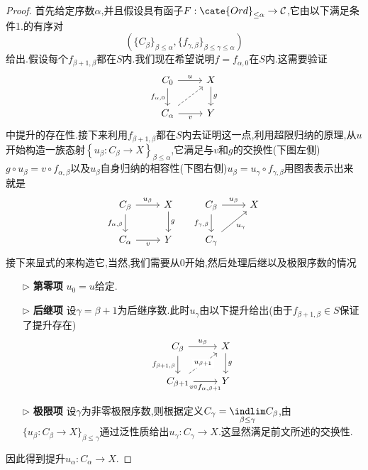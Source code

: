 \begin{proof}
    首先给定序数$\alpha$,并且假设具有函子$F : \cate{Ord}_{\leq \alpha}\to \mathcal{C}$,它由以下满足条件1.的有序对
    \[
        \left( \{C_{\beta}\}_{\beta \leq \alpha}, \{f_{\gamma,\beta}\}_{\beta \leq \gamma \leq \alpha} \right)
    \]
    给出.假设每个$f_{\beta+1,\beta}$都在$S$内.我们现在希望说明$f = f_{\alpha,0}$在$S$内.这需要验证
    \[\begin{tikzcd}
	{C_0} & X \\
	{C_{\alpha}} & Y
	\arrow["u", from=1-1, to=1-2]
	\arrow["{f_{\alpha,0}}"', from=1-1, to=2-1]
	\arrow["g", from=1-2, to=2-2]
	\arrow[dashed, from=2-1, to=1-2]
	\arrow["v"', from=2-1, to=2-2]
    \end{tikzcd}\]
    中提升的存在性.接下来利用$f_{\beta+1,\beta}$都在$S$内去证明这一点,利用超限归纳的原理,从$u$开始构造一族态射$\left\{ u_{\beta}: C_{\beta} \to X \right\}_{\beta \leq \alpha}$,它满足与$v$和$g$的交换性(下图左侧)$g\circ u_{\beta} = v\circ f_{\alpha,\beta}$以及$u_{\beta}$自身归纳的相容性(下图右侧)$u_{\beta}=u_{\gamma}\circ f_{\gamma,\beta}$用图表表示出来就是
    \[\begin{tikzcd}
	{C_{\beta}} & X & {C_{\beta}} & X \\
	{C_{\alpha}} & Y & {C_{\gamma}}
	\arrow["{u_{\beta}}", from=1-1, to=1-2]
	\arrow["{f_{\alpha,\beta}}"', from=1-1, to=2-1]
	\arrow["g", from=1-2, to=2-2]
	\arrow["{u_{\beta}}", from=1-3, to=1-4]
	\arrow["{f_{\gamma,\beta}}"', from=1-3, to=2-3]
	\arrow["v"', from=2-1, to=2-2]
	\arrow["{u_{\gamma}}"', from=2-3, to=1-4]
    \end{tikzcd}\]
    接下来显式的来构造它,当然,我们需要从$0$开始,然后处理后继以及极限序数的情况
    \begin{enumerate}
        \item[$\triangleright$ \textbf{第零项}] $u_0 = u$给定.
        \item[$\triangleright$ \textbf{后继项}] 设$\gamma = \beta +1$为后继序数.此时$u_{\gamma}$由以下提升给出(由于$f_{\beta+1,\beta}\in S$保证了提升存在)
        \[\begin{tikzcd}
	    {C_{\beta}} & X \\
	    {C_{\beta+1}} & Y
	    \arrow["{u_{\beta}}", from=1-1, to=1-2]
	    \arrow["{f_{\beta+1,\beta}}"', from=1-1, to=2-1]
	    \arrow["g", from=1-2, to=2-2]
	    \arrow["{u_{\beta+1}}"{description}, dashed, from=2-1, to=1-2]
	    \arrow["{v\circ f_{\alpha,\beta+1}}"', from=2-1, to=2-2]
        \end{tikzcd}\]
        \item[$\triangleright$ \textbf{极限项}] 设$\gamma$为非零极限序数,则根据定义$C_{\gamma} = \underset{\beta \leq \gamma}{\indlim} C_{\beta}$,由$\{u_{\beta}:C_{\beta} \to X\}_{\beta \leq \gamma}$通过泛性质给出$u_{\gamma}: C_{\gamma}\to X$.这显然满足前文所述的交换性.
    \end{enumerate}
    因此得到提升$u_{\alpha}:C_{\alpha}\to X$.
\end{proof}
